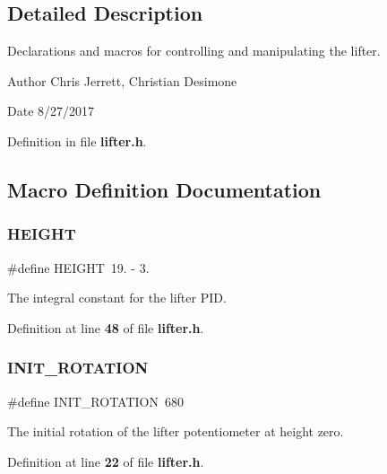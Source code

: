 \subsection{Detailed Description}
Declarations and macros for controlling and manipulating the lifter. 

\begin{DoxyAuthor}{Author}
Chris Jerrett, Christian Desimone 
\end{DoxyAuthor}
\begin{DoxyDate}{Date}
8/27/2017 
\end{DoxyDate}


Definition in file \textbf{ lifter.\+h}.



\subsection{Macro Definition Documentation}
\mbox{\label{lifter_8h_aed89bd71aee8be823e8a20ec4e093c1e}} 
\subsubsection{H\+E\+I\+G\+HT}
{\footnotesize\ttfamily \#define H\+E\+I\+G\+HT~19. -\/ 3.}



The integral constant for the lifter P\+ID. 



Definition at line \textbf{ 48} of file \textbf{ lifter.\+h}.

\mbox{\label{lifter_8h_a0685a3cee7d5cabe98d2c9c97bed5727}} 
\subsubsection{I\+N\+I\+T\+\_\+\+R\+O\+T\+A\+T\+I\+ON}
{\footnotesize\ttfamily \#define I\+N\+I\+T\+\_\+\+R\+O\+T\+A\+T\+I\+ON~680}



The initial rotation of the lifter potentiometer at height zero. 



Definition at line \textbf{ 22} of file \textbf{ lifter.\+h}.



